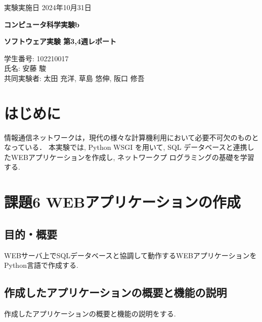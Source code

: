 \documentclass{ltjsarticle} %
\begin{document}
\thispagestyle{empty}
\begin{flushright}
{\large 実験実施日 2024年10月31日{\hspace{5cm}}} 
\end{flushright}

\vspace*{\fill}
\centering
{\Huge\bf コンピュータ科学実験b}
\vspace*{1cm}

{\huge\bf ソフトウェア実験 第3,4週レポート}
\vspace*{\fill}

\vspace*{\fill}

\vspace*{\fill}

\begin{flushright}
{\large 学生番号: 102210017} \\ %
{\large 氏名: 安藤 駿} \\

{\large 共同実験者: 太田 充洋, 草島 悠伸, 阪口 修吾} \\
\end{flushright}

\clearpage

\addtocounter{page}{-1}
\raggedright
\setlength{\parindent}{1em}

\section{はじめに}
情報通信ネットワークは，現代の様々な計算機利用において必要不可欠のものとなっている．
本実験では, Python WSGI を用いて, SQL データベースと連携したWEBアプリケーションを作成し, ネットワークプ
ログラミングの基礎を学習する. 


\section{課題6 WEBアプリケーションの作成}

\subsection{目的・概要}
WEBサーバ上でSQLデータベースと協調して動作するWEBアプリケーションをPython言語で作成する. 

\subsection{作成したアプリケーションの概要と機能の説明}
作成したアプリケーションの概要と機能の説明をする. 
\end{document}
